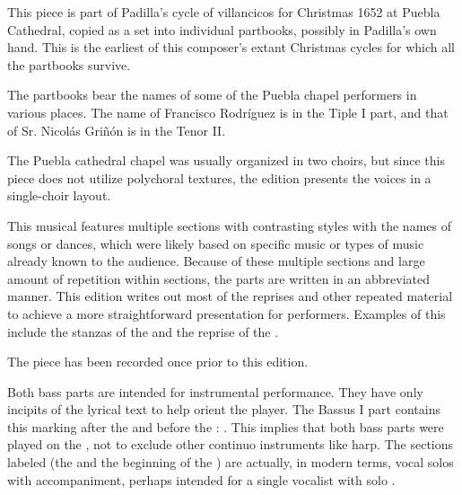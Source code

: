 
\begin{notesources}

\begin{source}
\end{source}

\end{notesources}

This piece is part of Padilla's cycle of villancicos for Christmas 1652 at 
Puebla Cathedral, copied as a set into individual partbooks, possibly in 
Padilla's own hand.%
    \Autocites{Cashner:PadillaRhythm-AMS}[406--462]{Cashner:PhD}
This is the earliest of this composer's extant Christmas cycles for which all 
the partbooks survive.

The partbooks bear the names of some of the Puebla chapel performers in various 
places.
The name of Francisco Rodríguez is in the Tiple I part, and that of Sr. Nicolás 
Griñón is in the Tenor II.

The Puebla cathedral chapel was usually organized in two choirs, but since this 
piece does not utilize polychoral textures, the edition presents the voices in 
a single-choir layout.

This musical  features multiple sections with contrasting styles
with the names of songs or dances, which were likely based on specific music or
types of music already known to the audience.
Because of these multiple sections and large amount of repetition within 
sections, the parts are written in an abbreviated manner.
This edition writes out most of the reprises and other repeated material to 
achieve a more straightforward presentation for performers.
Examples of this include the stanzas of the  and the 
 reprise of the .

The piece has been recorded once prior to this edition.%
  \autocite{Padilla:1652ChristmasCD}


Both bass parts are intended for instrumental performance.
They have only incipits of the lyrical text to help orient the player.
The Bassus I part contains this marking after the  and 
before the : .
This implies that both bass parts were played on the , not to 
exclude other continuo instruments like harp.
The sections labeled  (the  and the beginning of the 
) are actually, in modern terms, vocal solos with accompaniment, 
perhaps intended for a single vocalist with solo .

